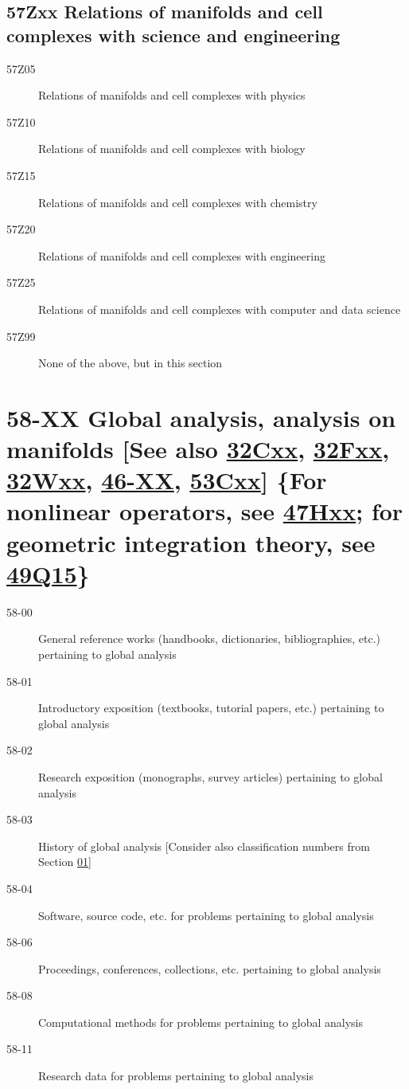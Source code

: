 \subsection*{57Zxx Relations of manifolds and cell complexes with science and engineering }\label{57Zxx}
\begin{description} 
\item [57Z05]\label{57Z05} Relations of manifolds and cell complexes with physics
\item [57Z10]\label{57Z10} Relations of manifolds and cell complexes with biology
\item [57Z15]\label{57Z15} Relations of manifolds and cell complexes with chemistry
\item [57Z20]\label{57Z20} Relations of manifolds and cell complexes with engineering
\item [57Z25]\label{57Z25} Relations of manifolds and cell complexes with computer and data science
\item [57Z99]\label{57Z99} None of the above, but in this section 
\end{description}
\section*{58-XX Global analysis, analysis on manifolds [See also \hyperref[32Cxx]{32Cxx}, \hyperref[32Fxx]{32Fxx}, \hyperref[32Wxx]{32Wxx}, \hyperref[46-XX]{46-XX}, \hyperref[53Cxx]{53Cxx}] \{For nonlinear operators, see \hyperref[47Hxx]{47Hxx}; for geometric integration theory, see \hyperref[49Q15]{49Q15}\} }\label{58-XX}
\begin{description}
\item [58-00]\label{58-00} General reference works (handbooks, dictionaries, bibliographies, etc.) pertaining to global analysis
\item [58-01]\label{58-01} Introductory exposition (textbooks, tutorial papers, etc.) pertaining to global analysis
\item [58-02]\label{58-02} Research exposition (monographs, survey articles) pertaining to global analysis
\item [58-03]\label{58-03} History of global analysis [Consider also classification numbers from Section \hyperref[01-XX]{01}]
\item [58-04]\label{58-04} Software, source code, etc. for problems pertaining to global analysis
\item [58-06]\label{58-06} Proceedings, conferences, collections, etc. pertaining to global analysis
\item [58-08]\label{58-08} Computational methods for problems pertaining to global analysis
\item [58-11]\label{58-11} Research data for problems pertaining to global analysis
\end{description}
